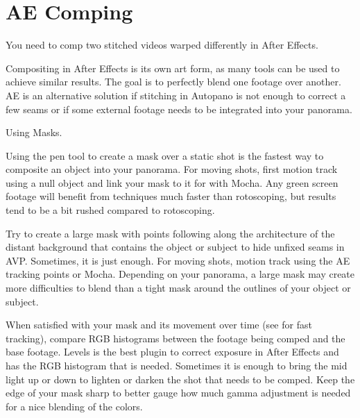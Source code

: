 \section{AE Comping}
\pagecolor{white}
\label{chap:51}
\begin{fullwidth}

\problem

{\large You need to comp two stitched videos warped differently in After Effects. \par}

Compositing in After Effects is its own art form, as many tools can be used to achieve similar results. The goal is to perfectly blend one footage over another. AE is an alternative solution if stitching in Autopano is not enough to correct a few seams or if some external footage needs to be integrated into your panorama.

\solution

{\large Using Masks. \par}

Using the pen tool to create a mask over a static shot is the fastest way to composite an object into your panorama. For moving shots, first motion track using a null object and link your mask to it for \textbf{} with Mocha. Any green screen footage will benefit from \textbf{} techniques much faster than rotoscoping, but results tend to be a bit rushed compared to rotoscoping.


Try to create a large mask with points following along the architecture of the distant background that contains the object or subject to hide unfixed seams in AVP. Sometimes, it is just enough. For moving shots, motion track using the AE tracking points or Mocha. Depending on your panorama, a large mask may create more difficulties to blend than a tight mask around the outlines of your object or subject. 


When satisfied with your mask and its movement over time (see \textbf{} for fast tracking), compare RGB histograms between the footage being comped and the base footage. Levels is the best plugin to correct exposure in After Effects and has the RGB histogram that is needed. Sometimes it is enough to bring the mid light up or down to lighten or darken the shot that needs to be comped. Keep the edge of your mask sharp to better gauge how much gamma adjustment is needed for a nice blending of the colors.


\end{fullwidth}
